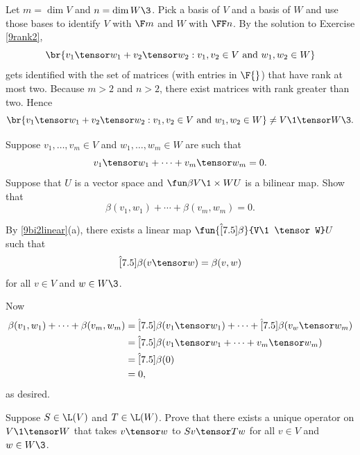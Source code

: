 \begin{Solution}
Let $m = \dim V$ and $n = \dim W\3$. Pick a basis of $V$ and a basis of $W$ and use those bases to identify $V$ with $\F m$ and $W$ with $\FF n$. By the solution to Exercise \ref{9rank2},
\[
\br{ v_1 \tensor w_1 + v_2 \tensor w_2 : v_1, v_2 \in V \text{ and } w_1, w_2 \in W }
\]
gets identified with the set of  matrices (with entries in $\F{}$) that have rank at most two. Because $m > 2$ and $n > 2$, there exist  matrices with rank greater than two. Hence
\[
\br{ v_1 \tensor w_1 + v_2 \tensor w_2 : v_1, v_2 \in V \text{ and } w_1, w_2 \in W } \ne V\1 \tensor W\3.
\]
\end{Solution}

\exercise
Suppose $v_1, \ldots, v_m \in V$ and $w_1, \ldots,w_m \in W$ are such that
\[
v_1 \tensor w_1 + \cdots + v_m \tensor w_m = 0.
\]
Suppose that $U$ is a vector space and $\fun \beta {V\1 \times W} U$ is a bilinear map.
Show that
\[
\beta(v_1, w_1) + \cdots + \beta(v_m, w_m) = 0.
\]
\exercisedisplayend

\begin{Solution}
By \ref{9bi2linear}(a), there exists a linear map $\fun {\hat[7.5]{\beta}} {V\1 \tensor W} U$ such that
\[
\hat[7.5]{\beta}(v \tensor w) = \beta(v, w)
\]
for all $v \in V$ and $w \in W\3$.

Now
\begin{align*}
\beta(v_1, w_1) + \cdots + \beta(v_m, w_m) &= \hat[7.5]{\beta}(v_1 \tensor w_1) + \cdots + \hat[7.5]{\beta}(v_w \tensor w_m) \\
&= \hat[7.5]{\beta}(v_1 \tensor w_1 + \cdots + v_m \tensor w_m ) \\
&= \hat[7.5]{\beta}(0) \\
&= 0,
\end{align*}
as desired.
\end{Solution}

\exercise
Suppose $S \in \L(V)$ and $T \in \L(W)$. Prove that there exists a unique operator on $V\1 \tensor W$ that takes
$v \tensor w$ to $Sv \tensor Tw$ for all $v \in V$ and $w \in W\3$.
\label{9LVtenLW}

